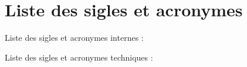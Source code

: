 \documentclass[a4paper,12pt]{book}
\theoremstyle{break}
\begin{document}

\frontmatter






\clearpage
\tableofcontents

\clearpage
\listoffigures

\clearpage

\chapter*{Liste des sigles et acronymes}

Liste des sigles et acronymes internes :\\

\begin{acronym}[CP-OFDMX]



\end{acronym}


Liste des sigles et acronymes techniques :\\
\end{document}
